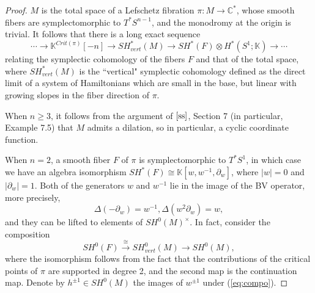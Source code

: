 \documentclass[a4paper]{article}
\numberwithin{equation}{section}
\begin{document}
\begin{proof}
$M$ is the total space of a Lefschetz fibration $\pi:M\rightarrow\mathbb{C}^\ast$, whose smooth fibers are symplectomorphic to $T^\ast S^{n-1}$, and the monodromy at the origin is trivial. It follows that there is a long exact sequence
\begin{equation}
\cdots\rightarrow\mathbb{K}^{\mathit{Crit}(\pi)}[-n]\rightarrow\mathit{SH}_\mathit{vert}^\ast(M)\rightarrow\mathit{SH}^\ast(F)\otimes H^\ast(S^1;\mathbb{K})\rightarrow\cdots
\end{equation}
relating the symplectic cohomology of the fibers $F$ and that of the total space, where $\mathit{SH}_\mathit{vert}^\ast(M)$ is the ``vertical" symplectic cohomology defined as the direct limit of a system of Hamiltonians which are small in the base, but linear with growing slopes in the fiber direction of $\pi$.

When $n\geq3$, it follows from the argument of $\cite{ss}$, Section 7 (in particular, Example 7.5) that $M$ admits a dilation, so in particular, a cyclic coordinate function.

When $n=2$, a smooth fiber $F$ of $\pi$ is symplectomorphic to $T^\ast S^1$, in which case we have an algebra isomorphism $\mathit{SH}^\ast(F)\cong\mathbb{K}[w,w^{-1},\partial_w]$, where $|w|=0$ and $|\partial_w|=1$. Both of the generators $w$ and $w^{-1}$ lie in the image of the BV operator, more precisely,
\begin{equation}\label{eq:vf}
\Delta(-\partial_w)=w^{-1}, \Delta(w^2\partial_w)=w,
\end{equation}
and they can be lifted to elements of $\mathit{SH}^0(M)^\times$. In fact, consider the composition
\begin{equation}\label{eq:compo}
\mathit{SH}^0(F)\xrightarrow{\cong}\mathit{SH}^0_\mathit{vert}(M)\rightarrow\mathit{SH}^0(M),
\end{equation}
where the isomorphism follows from the fact that the contributions of the critical points of $\pi$ are supported in degree 2, and the second map is the continuation map. Denote by $h^{\pm1}\in\mathit{SH}^0(M)$ the images of $w^{\pm1}$ under (\ref{eq:compo}). 


\end{proof}
\end{document}

